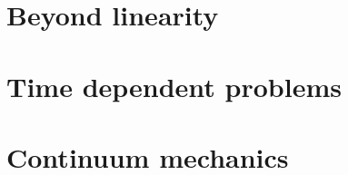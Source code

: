 \documentclass{scrbook}
\begin{document}
\chapter{Beyond linearity}\label{chapter:nonlinear}

\chapter{Time dependent problems}\label{chapter:dependent}

\chapter{Continuum mechanics}\label{chapter:continuum}



\end{document}
